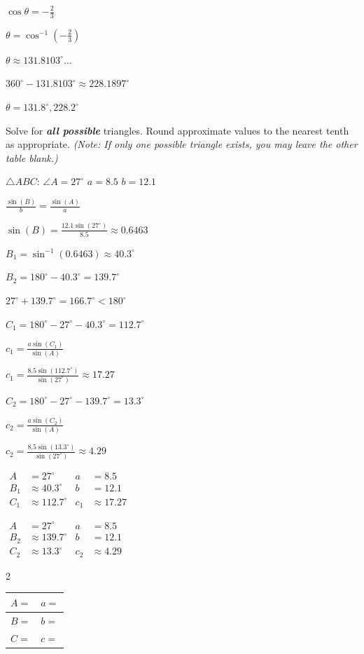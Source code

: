 \documentclass[11pt]{exam}
\begin{document}
\begin{questions}
%
\begin{solution}
\(\cos \theta = -\frac{2}{3}\)

\(\theta = \cos^{-1}\left(-\frac{2}{3}\right)\)

\(\theta \approx 131.8103^\circ \dots\)

\(360^\circ - 131.8103^\circ \approx 228.1897^\circ\)

\(\boxed{\theta = 131.8^\circ, 228.2^\circ}\)
\end{solution}
\answerline

\question[5] Solve for \textit{\textbf{all possible}} triangles. Round approximate values to the nearest tenth as appropriate. \emph{(Note: If only one possible triangle exists, you may leave the other table blank.)}

$\triangle{ABC}$: \quad \(\angle A = 27^\circ\) \qquad \(a = 8.5\) \qquad \(b = 12.1\)
\begin{solution}
\(\frac{\sin(B)}{b} = \frac{\sin(A)}{a}\)

\(\sin(B) = \frac{12.1\sin(27^\circ)}{8.5} \approx 0.6463\)

\(B_1 = \sin^{-1}(0.6463) \approx 40.3^\circ\)

\(B_2 = 180^\circ - 40.3^\circ = 139.7^\circ\)

\(27^\circ + 139.7^\circ = 166.7^\circ < 180^\circ\)

\(C_1 = 180^\circ - 27^\circ - 40.3^\circ = 112.7^\circ\)

\(c_1 = \frac{a\sin(C_1)}{\sin(A)}\)

\(c_1 = \frac{8.5\sin(112.7^\circ)}{\sin(27^\circ)} \approx 17.27\)

\(C_2 = 180^\circ - 27^\circ - 139.7^\circ = 13.3^\circ\)

\(c_2 = \frac{a\sin(C_2)}{\sin(A)}\)

\(c_2 = \frac{8.5\sin(13.3^\circ)}{\sin(27^\circ)} \approx 4.29\)

\(\boxed{\begin{aligned} A &= 27^\circ & a &= 8.5 \\ B_1 &\approx 40.3^\circ & b &= 12.1 \\ C_1 &\approx 112.7^\circ & c_1 &\approx 17.27 \end{aligned}}\)

\(\boxed{\begin{aligned} A &= 27^\circ & a &= 8.5 \\ B_2 &\approx 139.7^\circ & b &= 12.1 \\ C_2 &\approx 13.3^\circ & c_2 &\approx 4.29 \end{aligned}}\)
\end{solution}
\begin{multicols}{2}
    \renewcommand{\arraystretch}{2.5}
\begin{tabular}{|p{3cm}|p{3cm}|}\hline
   $A=$  & $a=$ \\\hline
   $B=$  & $b=$ \\\hline
   $C=$  & $c=$ \\\hline
\end{tabular}


\end{multicols}
\end{questions}
\end{document}
